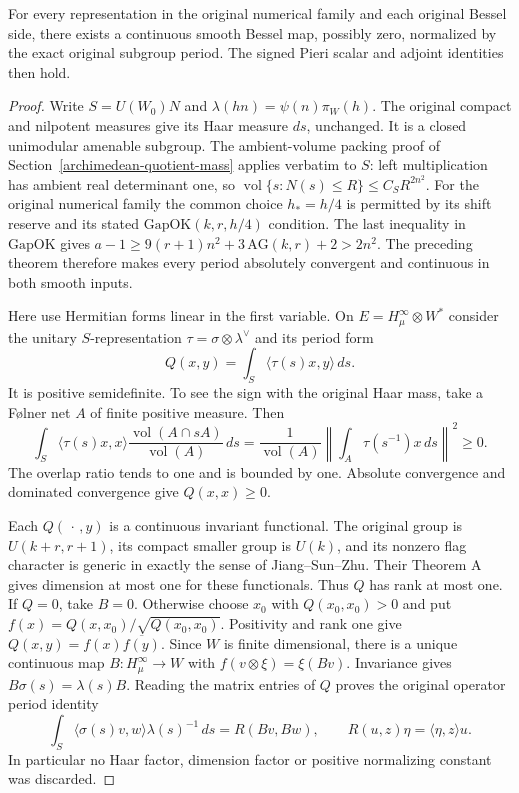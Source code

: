 \begin{theorem}\label{original-normalized-bessel-family}
For every representation in the original numerical family and each
original Bessel side, there exists a continuous smooth Bessel map,
possibly zero, normalized by the exact original subgroup period.
The signed Pieri scalar and adjoint identities then hold.
\end{theorem}
\begin{proof}
Write $S=U(W_0)N$ and
$\lambda(hn)=\psi(n)\pi_W(h)$.
The original compact and nilpotent measures give its Haar measure
$ds$, unchanged. It is a closed unimodular amenable subgroup.
The ambient-volume packing proof of
Section~\ref{archimedean-quotient-mass} applies verbatim to $S$:
left multiplication has ambient real determinant one, so
$\operatorname{vol}\{s:N(s)\le R\}\le C_SR^{2n^2}$.
For the original numerical family the common choice $h_*=h/4$
is permitted by its shift reserve and its stated
$\mathrm{GapOK}(k,r,h/4)$ condition. The last inequality in
$\mathrm{GapOK}$ gives
$a-1\ge9(r+1)n^2+3\,\mathrm{AG}(k,r)+2>2n^2$.
The preceding theorem therefore makes every period absolutely
convergent and continuous in both smooth inputs.

Here use Hermitian forms linear in the first variable. On
$E=H_\mu^\infty\otimes W^*$ consider the unitary $S$-representation
$\tau=\sigma\otimes\lambda^\vee$ and its period form
\[
 Q(x,y)=\int_S\langle\tau(s)x,y\rangle\,ds .
\]
It is positive semidefinite. To see the sign with the original
Haar mass, take a F{\o}lner net $A$ of finite positive measure.
Then
\[
 \int_S\langle\tau(s)x,x\rangle
       \frac{\operatorname{vol}(A\cap sA)}{\operatorname{vol}(A)}
       \,ds
 =\frac1{\operatorname{vol}(A)}
       \left\|\int_A\tau(s^{-1})x\,ds\right\|^2\ge0 .
\]
The overlap ratio tends to one and is bounded by one.
Absolute convergence and dominated convergence give $Q(x,x)\ge0$.

Each $Q(\,\cdot\,,y)$ is a continuous invariant functional.
The original group is $U(k+r,r+1)$, its compact smaller group is
$U(k)$, and its nonzero flag character is generic in exactly the
sense of Jiang--Sun--Zhu. Their Theorem A
\cite{pieri-family-jsz} gives dimension at most one for these
functionals. Thus $Q$ has rank at most one.
If $Q=0$, take $B=0$. Otherwise choose $x_0$ with
$Q(x_0,x_0)>0$ and put
$f(x)=Q(x,x_0)/\sqrt{Q(x_0,x_0)}$.
Positivity and rank one give
$Q(x,y)=f(x)\overline{f(y)}$.
Since $W$ is finite dimensional, there is a unique continuous
map $B:H_\mu^\infty\to W$ with
$f(v\otimes\xi)=\xi(Bv)$.
Invariance gives $B\sigma(s)=\lambda(s)B$.
Reading the matrix entries of $Q$ proves the original operator
period identity
\[
 \int_S\langle\sigma(s)v,w\rangle\lambda(s)^{-1}\,ds
   =R(Bv,Bw),\qquad R(u,z)\eta=\langle\eta,z\rangle u .
\]
In particular no Haar factor, dimension factor or positive
normalizing constant was discarded.


\end{proof}
